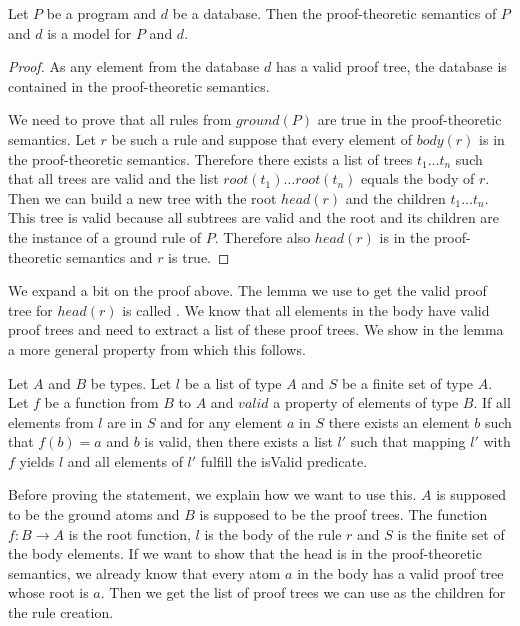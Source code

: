 \begin{lemma}[\proofTheoreticSemanticsIsModel]\label{lem:PTSModel}
    Let $P$ be a program and $d$ be a database. Then the proof-theoretic semantics of $P$ and $d$ is a model for $P$ and $d$.
\end{lemma}
\begin{proof}
    As any element from the database $d$ has a valid proof tree, the database is contained in the proof-theoretic semantics. 

    We need to prove that all rules from $ground(P)$ are true in the proof-theoretic semantics. Let $r$ be such a rule and suppose that every element of $body(r)$ is in the proof-theoretic semantics. Therefore there exists a list of trees $t_1 \dots t_n$ such that all trees are valid and the list $root(t_1) \dots root(t_n)$ equals the body of $r$. Then we can build a new tree with the root $head(r)$ and the children $t_1 \dots t_n$. This tree is valid because all subtrees are valid and the root and its children are the instance of a ground rule of $P$. Therefore also $head(r)$ is in the proof-theoretic semantics and $r$ is true.
\end{proof}

We expand a bit on the proof above. The lemma we use to get the valid proof tree for $head(r)$ is called \createProofTreeForRule. We know that all elements in the body have valid proof trees and need to extract a list of these proof trees. We show in the lemma \getTreeHelper a more general property from which this follows.

\begin{lemma}[\getTreeHelper]\label{lem:getTreeHelper}
    Let $A$ and $B$ be types. Let $l$ be a list of type $A$ and $S$ be a finite set of type $A$. Let $f$ be a function from $B$ to $A$ and $valid$ a property of elements of type $B$. If all elements from $l$ are in $S$ and for any element $a$ in $S$ there exists an element $b$ such that $f(b) = a $ and $b$ is valid, then there exists a list $l'$ such that mapping $l'$ with $f$ yields $l$ and all elements of $l'$ fulfill the isValid predicate.
\end{lemma}

Before proving the statement, we explain how we want to use this. $A$ is supposed to be the ground atoms and $B$ is supposed to be the proof trees. The function $f: B \to A$ is the root function, $l$ is the body of the rule $r$ and $S$ is the finite set of the body elements. If we want to show that the head is in the proof-theoretic semantics, we already know that every atom $a$ in the body has a valid proof tree whose root is $a$. Then we get the list of proof trees we can use as the children for the rule creation.

